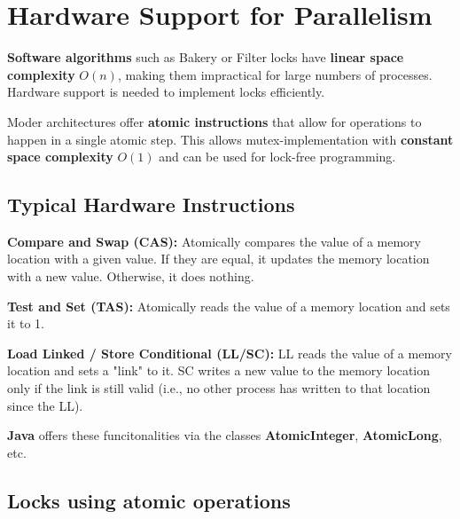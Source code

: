 \section{Hardware Support for Parallelism}

\begin{remark}
    \textbf{Software algorithms} such as Bakery or Filter locks have \textbf{linear space complexity} $O(n)$, making them impractical for large numbers of processes. Hardware support is needed to implement locks efficiently.
\end{remark}

\begin{remark}
    Moder architectures offer \textbf{atomic instructions} that allow for operations to happen in a single atomic step. This allows mutex-implementation with \textbf{constant space complexity} $O(1)$ and can be used for lock-free programming.
\end{remark}

\subsection{Typical Hardware Instructions}

\begin{definition}
    \textbf{Compare and Swap (CAS):} Atomically compares the value of a memory location with a given value. If they are equal, it updates the memory location with a new value. Otherwise, it does nothing.
\end{definition}

\begin{definition}
    \textbf{Test and Set (TAS):} Atomically reads the value of a memory location and sets it to 1.
\end{definition}

\begin{definition}
    \textbf{Load Linked / Store Conditional (LL/SC): } LL reads the value of a memory location and sets a "link" to it. SC writes a new value to the memory location only if the link is still valid (i.e., no other process has written to that location since the LL).
\end{definition}

\begin{remark}
    \textbf{Java} offers these funcitonalities via the classes \textbf{AtomicInteger}, \textbf{AtomicLong}, etc.
\end{remark}

\subsection{Locks using atomic operations}

